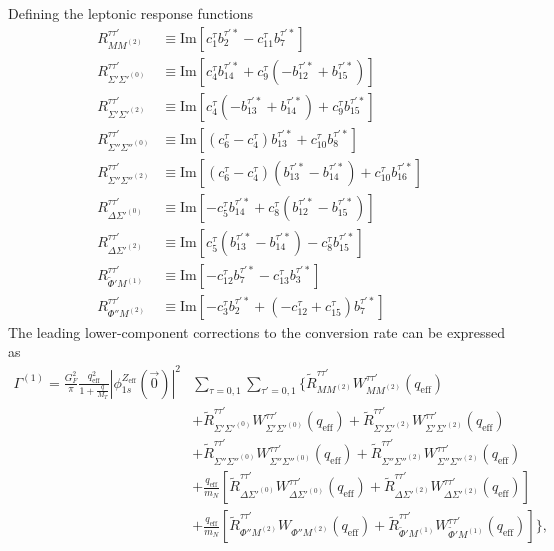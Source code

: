 \documentclass[12pt,letterpaper]{book}
\begin{document}
Defining the leptonic response functions
\begin{equation}
\begin{split}
R^{\tau\tau'}_{MM^{(2)}}&\equiv \mathrm{Im}\left[c_1^{\tau}b_2^{\tau'*}-c_{11}^{\tau}b_7^{\tau'*}\right]\\
R^{\tau\tau'}_{\Sigma'\Sigma'^{(0)}}&\equiv \mathrm{Im}\left[c_4^{\tau}b_{14}^{\tau'*}+c_9^{\tau}(-b_{12}^{\tau'*}+b_{15}^{\tau'*})\right]\\
R^{\tau\tau'}_{\Sigma'\Sigma'^{(2)}}&\equiv \mathrm{Im}\left[c_4^{\tau}(-b_{13}^{\tau'*}+b_{14}^{\tau'*})+c_9^{\tau}b_{15}^{\tau'*}\right]\\
R^{\tau\tau'}_{\Sigma''\Sigma''^{(0)}}&\equiv \mathrm{Im}\left[(c_6^{\tau}-c_4^{\tau})b_{13}^{\tau'*}+c_{10}^{\tau}b_8^{\tau'*}\right]\\
R^{\tau\tau'}_{\Sigma''\Sigma''^{(2)}}&\equiv\mathrm{Im}\left[(c_6^{\tau}-c_4^{\tau})(b_{13}^{\tau'*}-b_{14}^{\tau'*})+c_{10}^{\tau}b_{16}^{\tau'*}\right]\\
R^{\tau\tau'}_{\Delta\Sigma'^{(0)}}&\equiv \mathrm{Im}\left[-c_5^{\tau}b_{14}^{\tau'*}+c_8^{\tau}(b_{12}^{\tau'*}-b_{15}^{\tau'*})\right]\\
R^{\tau\tau'}_{\Delta\Sigma'^{(2)}}&\equiv \mathrm{Im}\left[c_5^{\tau}(b_{13}^{\tau'*}-b_{14}^{\tau'*})-c_8^{\tau}b_{15}^{\tau'*}\right]\\
R^{\tau\tau'}_{\tilde{\Phi}'M^{(1)}}&\equiv \mathrm{Im}\left[-c_{12}^{\tau}b_7^{\tau'*}-c_{13}^{\tau}b_3^{\tau'*}\right]\\
R^{\tau\tau'}_{\Phi''M^{(2)}}&\equiv \mathrm{Im}\left[-c_3^{\tau}b_2^{\tau'*}+(-c_{12}^{\tau}+c_{15}^{\tau})b_7^{\tau'*}\right]
\end{split}
\end{equation}
The leading lower-component corrections to the conversion rate can be expressed as
\begin{equation}
\begin{split}
\Gamma^{(1)}=\frac{G_F^2}{\pi}\frac{q_\mathrm{eff}^2}{1+\frac{q}{M_T}}|\phi_{1s}^{Z_\mathrm{eff}}(\vec{0})|^2&\sum_{\tau=0,1}\sum_{\tau'=0,1}\Bigg\{\tilde{R}_{MM^{(2)}}^{\tau\tau'}W_{MM^{(2)}}^{\tau\tau'}(q_\mathrm{eff})\\
&+\tilde{R}_{\Sigma'\Sigma'^{(0)}}^{\tau\tau'}W_{\Sigma'\Sigma'^{(0)}}^{\tau\tau'}(q_\mathrm{eff})+\tilde{R}_{\Sigma'\Sigma'^{(2)}}^{\tau\tau'}W_{\Sigma'\Sigma'^{(2)}}^{\tau\tau'}(q_\mathrm{eff})\\
&+\tilde{R}_{\Sigma''\Sigma''^{(0)}}^{\tau\tau'}W_{\Sigma''\Sigma''^{(0)}}^{\tau\tau'}(q_\mathrm{eff})+\tilde{R}_{\Sigma''\Sigma''^{(2)}}^{\tau\tau'}W_{\Sigma''\Sigma''^{(2)}}^{\tau\tau'}(q_\mathrm{eff})\\
&+\frac{q_\mathrm{eff}}{m_N}\left[\tilde{R}_{\Delta\Sigma'^{(0)}}^{\tau\tau'}W_{\Delta\Sigma'^{(0)}}^{\tau\tau'}(q_\mathrm{eff})+\tilde{R}_{\Delta\Sigma'^{(2)}}^{\tau\tau'}W_{\Delta\Sigma'^{(2)}}^{\tau\tau'}(q_\mathrm{eff})\right]\\
&+\frac{q_\mathrm{eff}}{m_N}\left[\tilde{R}_{\Phi''M^{(2)}}^{\tau\tau'}W_{\Phi''M^{(2)}}(q_\mathrm{eff})+\tilde{R}_{\tilde{\Phi}'M^{(1)}}^{\tau\tau'}W_{\tilde{\Phi}'M^{(1)}}^{\tau\tau'}(q_\mathrm{eff})\right]\Bigg\},
\end{split}
\label{eq:decay_leading_lower}
\end{equation}
\end{document}
